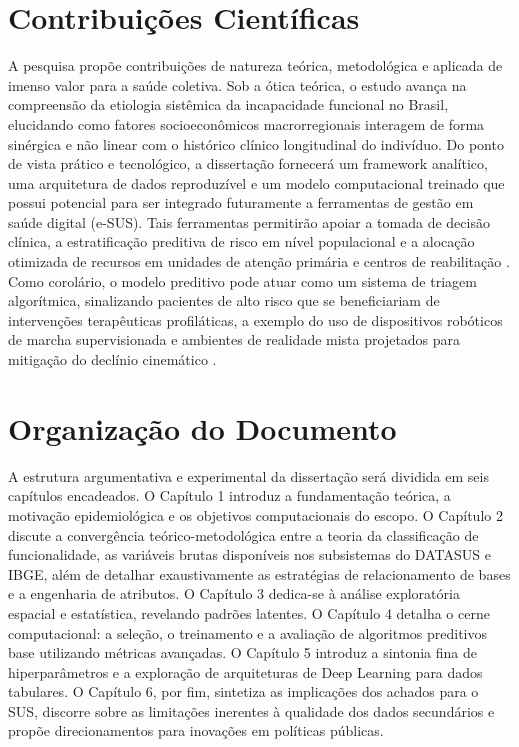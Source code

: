 \documentclass[12pt,openright,oneside,a4paper,brazil]{abntex2}
\begin{document}
\section{Contribuições Científicas}
A pesquisa propõe contribuições de natureza teórica, metodológica e aplicada de imenso valor para a saúde coletiva. Sob a ótica teórica, o estudo avança na compreensão da etiologia sistêmica da incapacidade funcional no Brasil, elucidando como fatores socioeconômicos macrorregionais interagem de forma sinérgica e não linear com o histórico clínico longitudinal do indivíduo. Do ponto de vista prático e tecnológico, a dissertação fornecerá um framework analítico, uma arquitetura de dados reproduzível e um modelo computacional treinado que possui potencial para ser integrado futuramente a ferramentas de gestão em saúde digital (e-SUS). Tais ferramentas permitirão apoiar a tomada de decisão clínica, a estratificação preditiva de risco em nível populacional e a alocação otimizada de recursos em unidades de atenção primária e centros de reabilitação \cite{ref16, ref17}. Como corolário, o modelo preditivo pode atuar como um sistema de triagem algorítmica, sinalizando pacientes de alto risco que se beneficiariam de intervenções terapêuticas profiláticas, a exemplo do uso de dispositivos robóticos de marcha supervisionada e ambientes de realidade mista projetados para mitigação do declínio cinemático \cite{ref18}.

\section{Organização do Documento}
A estrutura argumentativa e experimental da dissertação será dividida em seis capítulos encadeados. O Capítulo 1 introduz a fundamentação teórica, a motivação epidemiológica e os objetivos computacionais do escopo. O Capítulo 2 discute a convergência teórico-metodológica entre a teoria da classificação de funcionalidade, as variáveis brutas disponíveis nos subsistemas do DATASUS e IBGE, além de detalhar exaustivamente as estratégias de relacionamento de bases e a engenharia de atributos. O Capítulo 3 dedica-se à análise exploratória espacial e estatística, revelando padrões latentes. O Capítulo 4 detalha o cerne computacional: a seleção, o treinamento e a avaliação de algoritmos preditivos base utilizando métricas avançadas. O Capítulo 5 introduz a sintonia fina de hiperparâmetros e a exploração de arquiteturas de Deep Learning para dados tabulares. O Capítulo 6, por fim, sintetiza as implicações dos achados para o SUS, discorre sobre as limitações inerentes à qualidade dos dados secundários e propõe direcionamentos para inovações em políticas públicas.
\end{document}
